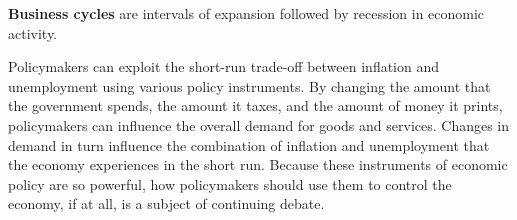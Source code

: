 \textbf{Business cycles} are intervals of expansion followed by recession in economic activity.
\ed

Policymakers can exploit the short-run trade-off between inflation and unemployment using various policy instruments.
By changing the amount that the government spends, the amount it taxes, and the amount of money it prints,
policymakers can influence the overall demand for goods and services. Changes in demand in turn influence the
combination of inflation and unemployment that the economy experiences in the short run. Because these instruments of
economic policy are so powerful, how policymakers should use them to control the economy, if at all, is a subject of
continuing debate.